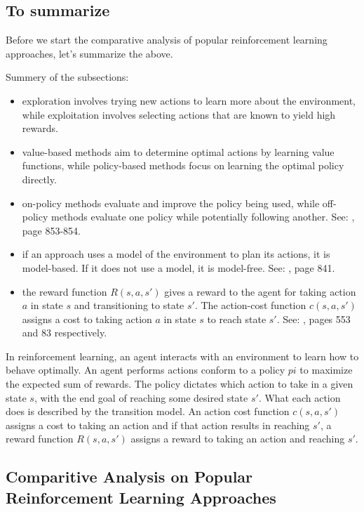 \newpage
\subsection{To summarize}

Before we start the comparative analysis of popular reinforcement learning approaches, let's summarize the above.

Summery of the subsections:
\begin{itemize}
    \item exploration involves trying new actions to learn more about the environment, while exploitation involves selecting actions that are known to yield high rewards.
    \item value-based methods aim to determine optimal actions by learning value functions, while \gls{policy}-based methods focus on learning the optimal \gls{policy} directly.
    \item on-\gls{policy} methods evaluate and improve the \gls{policy} being used, while off-\gls{policy} methods evaluate one \gls{policy} while potentially following another. See: \cite{rn2022aima}, page 853-854.
    \item if an approach uses a model of the environment to plan its actions, it is model-based. If it does not use a model, it is model-free. See: \cite{rn2022aima}, page 841.
    \item the \gls{reward function} $R(s, a, s')$ gives a reward to the \gls{agent} for taking action $a$ in state $s$ and transitioning to state $s'$. The \gls{action-cost function} $c(s, a, s')$ assigns a cost to taking action $a$ in state $s$ to reach state $s'$. See: \cite{rn2022aima}, pages 553 and 83 respectively.
\end{itemize}

In reinforcement learning, an agent interacts with an environment to learn how to behave optimally.
An agent performs actions conform to a \gls{policy} $pi$ to maximize the expected sum of rewards. 
The \gls{policy} dictates which action to take in a given state $s$, with the end goal of reaching some desired state $s'$.
What each action does is described by the \gls{transition model}.
An action cost function $c(s, a, s')$ assigns a cost to taking an action and if that action results in reaching $s'$, a \gls{reward function} $R(s, a, s')$ assigns a reward to taking an action and reaching $s'$.

\newpage
\subsection{Comparitive Analysis on Popular Reinforcement Learning Approaches}

